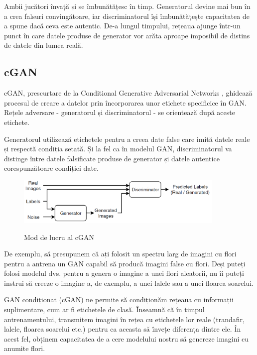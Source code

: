 Ambii jucători învață și se îmbunătățesc în timp. Generatorul devine mai bun în a crea falsuri convingătoare, iar discriminatorul își îmbunătățește capacitatea de a spune dacă ceva este autentic. De-a lungul timpului, rețeaua ajunge într-un punct în care datele produse de generator vor arăta aproape imposibil de distins de datele din lumea reală.



\subsection*{cGAN}
\hspace{0.5 cm} cGAN, prescurtare de la Conditional Generative Adversarial Networks \cite{CGAN}, ghidează procesul de creare a datelor prin încorporarea unor etichete specificice în GAN. Rețele adversare - generatorul și discriminatorul - se orientează după aceste etichete. 

Generatorul utilizează etichetele pentru a creea date false care imită datele reale și respectă condiția setată. Și la fel ca în modelul GAN, discriminatorul va distinge între datele falsificate produse de generator și datele autentice corespunzătoare condiției date.
\newpage

\begin{figure}[ht]
\centering
{\includegraphics[width=10cm]{imagini/cGANarch.png}}
\caption{Mod de lucru al cGAN}
\label{modDeLucrucGAN}
\end{figure}



De exemplu, să presupunem că ați folosit un spectru larg de imagini cu flori pentru a antrena un GAN capabil să producă imagini false cu flori. Deși puteți folosi modelul dvs. pentru a genera o imagine a unei flori aleatorii, nu îi puteți instrui să creeze o imagine a, de exemplu, a unei lalele sau a unei floarea soarelui.

GAN condiționat (cGAN) ne permite să condiționăm rețeaua cu informații suplimentare, cum ar fi etichetele de clasă. Înseamnă că în timpul antrenamentului, transmitem imagini în rețea cu etichetele lor reale (trandafir, lalele, floarea soarelui etc.) pentru ca aceasta să învețe diferența dintre ele. În acest fel, obținem capacitatea de a cere modelului nostru să genereze imagini cu anumite flori.


